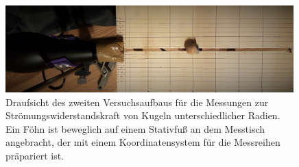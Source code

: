 \begin{figure}[htbp]
\centering
 \includegraphics[width=0.99\textwidth]{images/stroemungskraftmessung4.jpg}
  \caption[Zweiter Versuchsaufbau zur Srömungskraftmessung]{Draufsicht des zweiten Versuchsaufbaus für die Messungen zur Strömungswiderstandskraft von Kugeln unterschiedlicher Radien. Ein Föhn ist beweglich auf einem Stativfuß an dem Messtisch angebracht, der mit einem Koordinatensystem für die Messreihen präpariert ist.}
  \label{fig:stroemungskraftmessung4}
  \vspace{-0pt}
\end{figure}